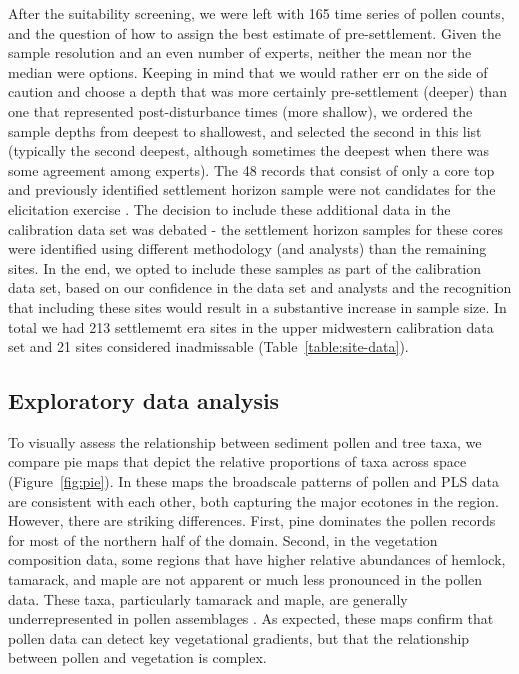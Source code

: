 \documentclass[12pt]{article}
\begin{document}
After the suitability screening, we were left with 165 time series of
pollen counts, and the question of how to assign the best estimate of
pre-settlement. Given the sample resolution and an even number of
experts, neither the mean nor the median were options. Keeping in mind
that we would rather err on the side of caution and choose a depth
that was more certainly pre-settlement (deeper) than one that
represented post-disturbance times (more shallow), we ordered the
sample depths from deepest to shallowest, and selected the second in
this list (typically the second deepest, although sometimes the
deepest when there was some agreement among experts).  The 48 records
that consist of only a core top and previously identified settlement
horizon sample were not candidates for the elicitation exercise . The
decision to include these additional data in the calibration data set
was debated - the settlement horizon samples for these cores were
identified using different methodology (and analysts) than the
remaining sites. In the end, we opted to include these samples as part
of the calibration data set, based on our confidence in the data set
and analysts and the recognition that including these sites would
result in a substantive increase in sample size. In total we had 213
settlememt era sites in the upper midwestern calibration data set and
21 sites considered inadmissable (Table~\ref{table:site-data}).

\subsection{Exploratory data analysis}

To visually assess the relationship between sediment pollen and tree
taxa, we compare pie maps that depict the relative proportions of taxa
across space (Figure~\ref{fig:pie}). In these maps the broadscale
patterns of pollen and PLS data are consistent with each other, both
capturing the major ecotones in the region.  However, there are
striking differences. First, pine dominates the pollen records for
most of the northern half of the domain. Second, in the vegetation
composition data, some regions that have higher relative abundances of
hemlock, tamarack, and maple are not apparent or much less pronounced
in the pollen data. These taxa, particularly tamarack and maple, are
generally underrepresented in pollen assemblages
\citep{webb1981estimating, bradshaw1985relationships, jackson1990}. As
expected, these maps confirm that pollen data can detect key
vegetational gradients, but that the relationship between pollen and
vegetation is complex.
\end{document}
